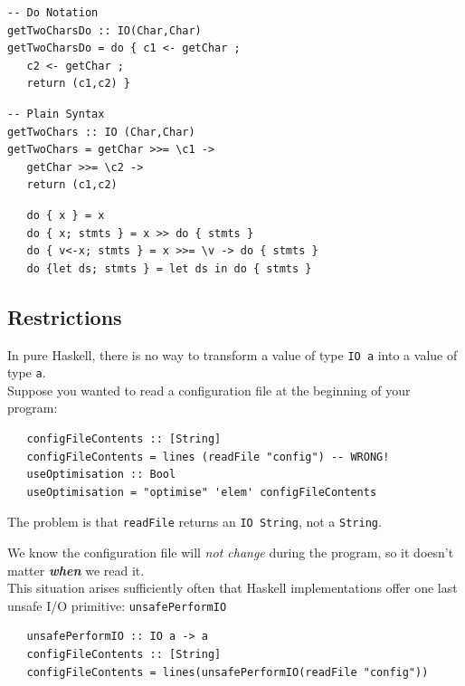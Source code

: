 \begin{paracol}{2}
\begin{lstlisting}
-- Do Notation
getTwoCharsDo :: IO(Char,Char)
getTwoCharsDo = do { c1 <- getChar ;
   c2 <- getChar ;
   return (c1,c2) }
\end{lstlisting}
\switchcolumn
\begin{lstlisting}
-- Plain Syntax
getTwoChars :: IO (Char,Char)
getTwoChars = getChar >>= \c1 ->
   getChar >>= \c2 ->
   return (c1,c2)
\end{lstlisting}

\end{paracol}

\begin{lstlisting}
   do { x } = x
   do { x; stmts } = x >> do { stmts }
   do { v<-x; stmts } = x >>= \v -> do { stmts }
   do {let ds; stmts } = let ds in do { stmts }
\end{lstlisting}

\subsection{Restrictions}
In pure Haskell, there is no way to transform a value of type
\lstinline|IO a| into a value of type \lstinline|a|.\\
Suppose you wanted to read a configuration file at the
beginning of your program:
\begin{lstlisting}
   configFileContents :: [String]
   configFileContents = lines (readFile "config") -- WRONG!
   useOptimisation :: Bool
   useOptimisation = "optimise" 'elem' configFileContents
\end{lstlisting}
The problem is that \lstinline|readFile| returns an \lstinline|IO String|, not a
\lstinline|String|.

We know the configuration file will \textit{not change}
during the program, so it doesn’t matter \textit{\textbf{when}} we
read it.\\
This situation arises sufficiently often that Haskell
implementations offer one last unsafe I/O primitive:
\lstinline|unsafePerformIO|
\begin{lstlisting}
   unsafePerformIO :: IO a -> a
   configFileContents :: [String]
   configFileContents = lines(unsafePerformIO(readFile "config"))
\end{lstlisting}

